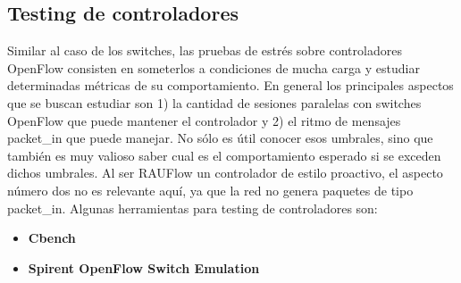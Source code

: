 \subsection{Testing de controladores}
Similar al caso de los switches, las pruebas de estrés sobre controladores OpenFlow consisten en someterlos a condiciones de mucha carga y estudiar determinadas métricas de su comportamiento. En general los principales aspectos que se buscan estudiar son 1) la cantidad de sesiones paralelas con switches OpenFlow que puede mantener el controlador y 2) el ritmo de mensajes packet\_in que puede manejar. No sólo es útil conocer esos umbrales, sino que también es muy valioso saber cual es el comportamiento esperado si se exceden dichos umbrales. Al ser RAUFlow un controlador de estilo proactivo, el aspecto número dos no es relevante aquí, ya que la red no genera paquetes de tipo packet\_in. Algunas herramientas para testing de controladores son:
\begin{itemize}
	\item \textbf{Cbench} \cite{cbench}
	\item \textbf{Spirent OpenFlow Switch Emulation} \cite{spirent-switch-emulation}
\end{itemize}


